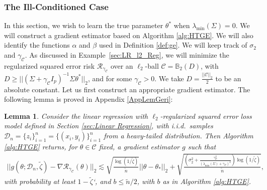 \documentclass{article}
\newtheorem{lemma}{Lemma}
\begin{document}
\subsubsection{The Ill-Conditioned Case}\label{sec:Ill_Cond_Sec_FW}

In this section, we wish to learn the true parameter $\theta^*$ when $\lambda_{\min}(\Sigma) = 0$.
We will construct a gradient estimator based on Algorithm \ref{alg:HTGE}. We will also identify the functions $\alpha$ and $\beta$ used in Definition \ref{def:ge}. We will keep track of $\sigma_2$ and $\gamma_{\mathcal{C}}$. As discussed in Example~\ref{sec:LR_l2_Reg}, we will minimize the regularized squared error risk $\mathcal{R}_{\gamma_{\mathcal{C}}}$ over an $\ell_2$-ball $\mathcal{C} = \mathbb{B}_2(D)$, with $D \geq ||(\Sigma + \gamma_{\mathcal{C}} I_p)^{-1}\Sigma\theta^*||_2$, and for some $\gamma_{\mathcal{C}} > 0$.
We take $D = \frac{||\mathcal{C}||_2}{2}$ to be an absolute constant.
Let us first construct an appropriate gradient estimator. The following lemma is proved in Appendix \ref{AppLemGeri}:

\begin{lemma}
\label{lemma:geri}
Consider the linear regression with $\ell_2$-regularized squared error loss model defined in Section \ref{sec:Linear Regression}, with i.i.d.\ samples $\mathcal{D}_n = \{z_i\}_{i = 1}^n = \{(x_i, y_i)\}_{i = 1}^n$ from a heavy-tailed distribution. Then Algorithm \ref{alg:HTGE} returns, for $\theta \in \mathcal{C}$ fixed, a gradient estimator $g$ such that
\begin{align*}
||g(\theta; \mathcal{D}_n, \widetilde{\zeta}) - \nabla\mathcal{R}_{\gamma_{\mathcal{C}}}(\theta)||_2  \lesssim \sqrt{\frac{\log(1/\widetilde{\zeta})}{\widetilde{n}}}||\theta - \theta_*||_2 + \sqrt{\frac{\left(\sigma_2^2 + \frac{\gamma_{\mathcal{C}}^2}{(\lambda_{\min}(\Sigma) + \gamma_{\mathcal{C}})^2}\right)\log(1/\widetilde{\zeta})}{\widetilde{n}}},
\end{align*}
with probability at least $1 - \widetilde{\zeta}$`, and $b \leq \widetilde{n}/2$, with $b$ as in Algorithm \ref{alg:HTGE}.
\end{lemma}
\end{document}
